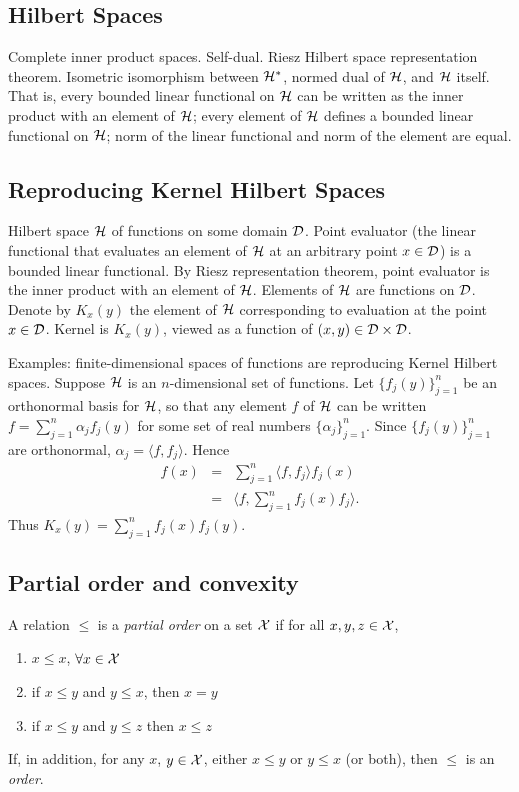 \subsection{Hilbert Spaces}
Complete inner product spaces.
Self-dual.
Riesz Hilbert space representation theorem.
Isometric isomorphism between ${\cal H}^*$, normed dual of ${\cal H}$, and ${\cal H}$ itself.
That is, every bounded linear functional on ${\cal H}$ can be written as the inner product
with an element of ${\cal H}$; every element of ${\cal H}$ defines a bounded linear functional on
${\cal H}$; norm of the linear functional and norm of the element are equal.


\subsection{Reproducing Kernel Hilbert Spaces}
Hilbert space ${\cal H}$ of functions on some domain ${\cal D}$.
Point evaluator (the linear functional that evaluates an element of ${\cal H}$ at an
arbitrary point $x \in {\cal D}$)
is a bounded linear functional.
By Riesz representation theorem, point evaluator is the inner product with
an element of ${\cal H}$.
Elements of ${\cal H}$ are functions on ${\cal D}$.  
Denote by $K_x(y)$ the element of ${\cal H}$ corresponding to evaluation at the point $x \in {\cal D}$.
Kernel is $K_x(y)$, viewed as a function of $(x,y) \in {\cal D} \times {\cal D}$. 

Examples: finite-dimensional spaces of functions are reproducing Kernel Hilbert spaces.
Suppose ${\cal H}$ is an $n$-dimensional set of functions.  
Let $\{ f_j(y) \}_{j=1}^n$ be an orthonormal basis for ${\cal H}$, so that any element $f$ of
${\cal H}$ can be written $f = \sum_{j=1}^n \alpha_j f_j(y)$ for some set of 
real numbers $\{\alpha_j\}_{j=1}^n$.
Since $\{ f_j(y) \}_{j=1}^n$ are orthonormal, $\alpha_j = \langle f, f_j \rangle$.
Hence 
\begin{eqnarray}
    f(x) & = & \sum_{j=1}^n \langle f, f_j \rangle f_j(x) \nonumber \\
          & = &  \langle f, \sum_{j=1}^n f_j(x) f_j \rangle .
\end{eqnarray}
Thus $K_x(y) = \sum_{j=1}^n f_j(x) f_j(y)$.


\subsection{Partial order and convexity}
\begin{Definition}
        A relation $\le$ is a {\em partial order} on a set ${\cal X}$ if for all $x, y, z \in {\cal X}$,
        \begin{enumerate}
                \item $x \le x$, $\forall x \in {\cal X}$
                \item if $x \le y$ and $y \le x$, then $x = y$
                \item if $x \le y$ and $y \le z$ then $x \le z$
        \end{enumerate}
        If, in addition,
                for any $x$, $y \in {\cal X}$, either $x \le y$ or $y \le x$ (or both), then
                $\le$ is an {\em order\/}.
\end{Definition}

